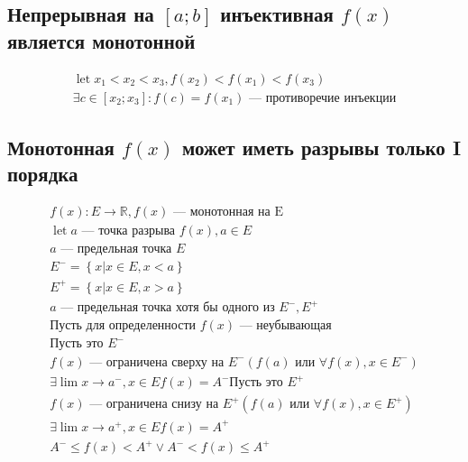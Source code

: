 \documentclass{article}
\DeclareMathOperator*{\Let}{let}
\begin{document}
\subsection{Непрерывная на $[a; b]$ инъективная $f(x)$ является монотонной}

\begin{gather*}
	\Let x_1 < x_2 < x_3, f(x_2) < f(x_1) < f(x_3) \\
	\exists c \in [x_2; x_3] : f(c) = f(x_1) \text{ --- противоречие инъекции}
\end{gather*}

\subsection{Монотонная $f(x)$ может иметь разрывы только I порядка}

\begin{gather*}
	f(x) : E \to \mathbb{R}, f(x) \text{ --- монотонная на E} \\
	\Let a \text{ --- точка разрыва } f(x), a \in E \\
	a \text{ --- предельная точка } E \\
	E^- = \left\{ x | x \in E, x < a \right\} \\
	E^+ = \left\{ x | x \in E, x > a \right\} \\
	a \text{ --- предельная точка хотя бы одного из } E^-, E^+ \\
	\text{Пусть для определенности $f(x)$ --- неубывающая} \\
	\text{Пусть это } E^- \\
	f(x) \text{ --- ограничена сверху на } E^- (f(a) \text{ или } \forall f(x), x \in E^-) \\
	\exists \lim{x \to a^-, x \in E} f(x) = A^-
	\text{Пусть это } E^+ \\
	f(x) \text{ --- ограничена снизу на } E^+ (f(a) \text{ или } \forall f(x), x \in E^+) \\
	\exists \lim{x \to a^+, x \in E} f(x) = A^+ \\
	A^- \le f(x) < A^+ \lor A^- < f(x) \le A^+
\end{gather*}
\end{document}
